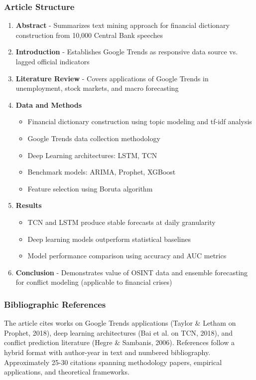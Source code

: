 \documentclass[12pt,a4paper]{article}
\begin{document}
\subsubsection{Article Structure}
\begin{enumerate}
    \item \textbf{Abstract} - Summarizes text mining approach for financial dictionary construction from 10,000 Central Bank speeches
    \item \textbf{Introduction} - Establishes Google Trends as responsive data source vs. lagged official indicators
    \item \textbf{Literature Review} - Covers applications of Google Trends in unemployment, stock markets, and macro forecasting
    \item \textbf{Data and Methods}
    \begin{itemize}
        \item Financial dictionary construction using topic modeling and tf-idf analysis
        \item Google Trends data collection methodology
        \item Deep Learning architectures: LSTM, TCN
        \item Benchmark models: ARIMA, Prophet, XGBoost
        \item Feature selection using Boruta algorithm
    \end{itemize}
    \item \textbf{Results}
    \begin{itemize}
        \item TCN and LSTM produce stable forecasts at daily granularity
        \item Deep learning models outperform statistical baselines
        \item Model performance comparison using accuracy and AUC metrics
    \end{itemize}
    \item \textbf{Conclusion} - Demonstrates value of OSINT data and ensemble forecasting for conflict modeling (applicable to financial crises)
\end{enumerate}

\subsubsection{Bibliographic References}
The article cites works on Google Trends applications (Taylor \& Letham on Prophet, 2018), deep learning architectures (Bai et al. on TCN, 2018), and conflict prediction literature (Hegre \& Sambanis, 2006). References follow a hybrid format with author-year in text and numbered bibliography. Approximately 25-30 citations spanning methodology papers, empirical applications, and theoretical frameworks.
\end{document}

